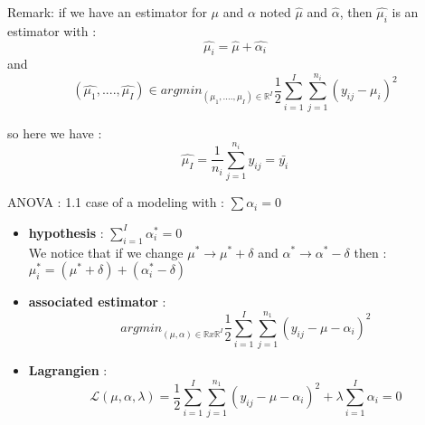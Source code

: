 \documentclass[unknownkeysallowed]{beamer}
\begin{document}
\begin{frame}
\begin{alertblock}{Remark:}
if we have an estimator for $\mu$ and $\alpha$ noted $\hat{\mu}$ and $\hat{\alpha}$, then $\hat{\mu_i}$ is an estimator with : $$\hat{\mu_i}=  \hat{\mu} +  \hat{\alpha_i}  $$
and $$ (\hat{\mu_1},....,\hat{\mu_I}) \in {argmin}_{(\mu_1,....,\mu_I)\in \mathbb{R}^I} \frac{1}{2} \sum\limits_{i=1}^I \sum\limits_{j=1}^{n_i}(y_{ij}-\mu_i)^2$$

so here we have : $$ \hat{\mu_I}=\frac{1}{n_i} \sum\limits_{j=1}^{n_i}y_{ij} = \bar{y_i}$$
\end{alertblock}
\end{frame}


\begin{frame}

\begin{alertblock}{ANOVA : 1.1 case of a modeling with  : $\sum\alpha_i=0$}
    \begin{itemize}
        \item  \textbf{hypothesis} : $\sum\limits_{i=1}^{I}\alpha_i^*=0 $ \\
          We notice that if we change $\mu^*\longrightarrow \mu^*+\delta$ and $\alpha^*\longrightarrow \alpha^*-\delta$ then : $\mu_i^*=(\mu^* + \delta)+(\alpha_i^*-\delta)$
        \item \textbf{associated estimator} : $${argmin}_{(\mu,\alpha)\in \mathbb{R} x \mathbb{R}^I} \frac{1}{2} \sum\limits_{i=1}^I \sum\limits_{j=1}^{n_1}(y_{ij}-\mu - \alpha_i)^2$$
        \item \textbf{Lagrangien} : $$\mathcal{L}(\mu,\alpha,\lambda)=\frac{1}{2} \sum\limits_{i=1}^I \sum\limits_{j=1}^{n_1}(y_{ij}-\mu - \alpha_i)^2 + \lambda \sum\limits_{i=1}^{I}\alpha_i=0 $$
    \end{itemize}


\end{alertblock}
\end{frame}
\end{document}

